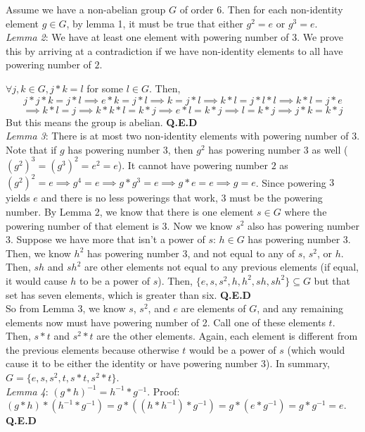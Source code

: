 \documentclass{amsart}
\begin{document}
\begin{enumerate}[itemsep=0.4in]
Assume we have a non-abelian group $G$ of order $6$. Then for each non-identity element $g\in G$, by lemma 1, it must be true that either $g^2=e$ or $g^3=e$.\\

\emph{Lemma 2}: We have at least one element with powering number of $3$. We prove this by arriving at a contradiction if we have non-identity elements to all have powering number of $2$. 

$\forall j,k\in G,j*k=l$ for some $l\in G$. Then, $$j*j*k=j*l\implies e*k=j*l\implies k=j*l\implies k*l=j*l*l\implies k*l=j*e$$
$$\implies k*l=j\implies k*k*l=k*j\implies e*l=k*j\implies l=k*j\implies j*k=k*j$$ But this means the group is abelian. \textbf{Q.E.D}\\

\emph{Lemma 3}: There is at most two non-identity elements with powering number of $3$. Note that if $g$ has powering number $3$, then $g^2$ has powering number $3$ as well ($(g^2)^3=(g^3)^2=e^2=e$). It cannot have powering number $2$ as $(g^2)^2=e\implies g^4=e\implies g*g^3=e\implies g*e=e\implies g=e$. Since powering $3$ yields $e$ and there is no less powerings that work, $3$ must be the powering number. By Lemma 2, we know that there is one element $s\in G$ where the powering number of that element is 3. Now we know $s^2$ also has powering number 3. Suppose we have more that isn't a power of $s$: $h\in G$ has powering number 3. Then, we know $h^2$ has powering number 3, and not equal to any of $s$, $s^2$, or $h$. Then, $sh$ and $sh^2$ are other elements not equal to any previous elements (if equal, it would cause $h$ to be a power of $s$). Then, $\{e,s,s^2,h,h^2,sh,sh^2\}\subseteq G$ but that set has seven elements, which is greater than six. \textbf{Q.E.D}\\

So from Lemma 3, we know $s$, $s^2$, and $e$ are elements of $G$, and any remaining elements now must have powering number of 2. Call one of these elements $t$. Then, $s*t$ and $s^2*t$ are the other elements. Again, each element is different from the previous elements because otherwise $t$ would be a power of $s$ (which would cause it to be either the identity or have powering number 3). In summary, $G=\{e,s,s^2,t,s*t,s^2*t\}$.\\

\emph{Lemma 4}: $(g*h)^{-1}=h^{-1}*g^{-1}$. Proof: $(g*h)*(h^{-1}*g^{-1})=g*((h*h^{-1})*g^{-1})=g*(e*g^{-1})=g*g^{-1}=e$. \textbf{Q.E.D} \\



\end{enumerate}
\end{document}

